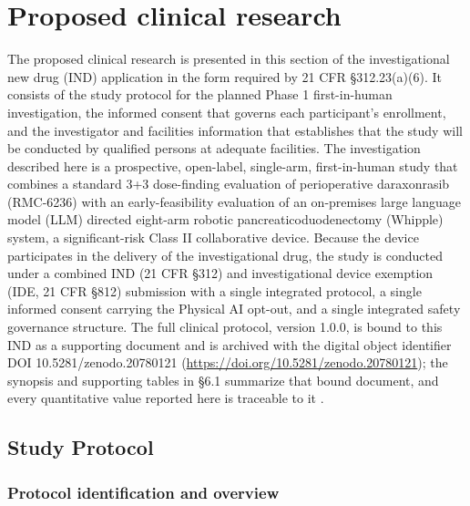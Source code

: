 \section{Proposed clinical research}

The proposed clinical research is presented in this section of the investigational
new drug (IND) application in the form required by 21 CFR \S 312.23(a)(6). It
consists of the study protocol for the planned Phase 1 first-in-human
investigation, the informed consent that governs each participant's enrollment,
and the investigator and facilities information that establishes that the study
will be conducted by qualified persons at adequate facilities. The investigation
described here is a prospective, open-label, single-arm, first-in-human study that
combines a standard 3+3 dose-finding evaluation of perioperative daraxonrasib
(RMC-6236) with an early-feasibility evaluation of an on-premises large language
model (LLM) directed eight-arm robotic pancreaticoduodenectomy (Whipple) system, a
significant-risk Class II collaborative device. Because the device participates in
the delivery of the investigational drug, the study is conducted under a combined
IND (21 CFR \S 312) and investigational device exemption (IDE, 21 CFR \S 812)
submission with a single integrated protocol, a single informed consent carrying
the Physical AI opt-out, and a single integrated safety governance structure. The
full clinical protocol, version 1.0.0, is bound to this IND as a supporting
document and is archived with the digital object identifier
DOI 10.5281/zenodo.20780121
(\href{https://doi.org/10.5281/zenodo.20780121}{https://doi.org/10.5281/zenodo.20780121});
the synopsis and supporting tables in \S 6.1 summarize that bound document, and
every quantitative value reported here is traceable to it
\cite{daraxwhipple,onpremwhippl}.

\subsection{Study Protocol}

\subsubsection*{Protocol identification and overview}

